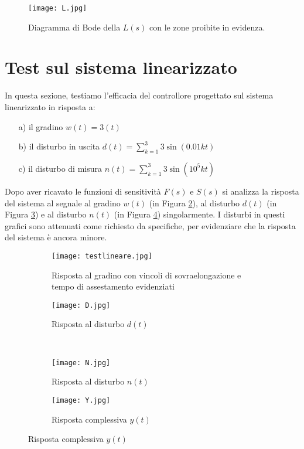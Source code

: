 \documentclass[a4paper, 11pt]{article}
\begin{document}
	\begin{figure}[h]
		\centering
		\texttt{[image: L.jpg]}
		\caption{Diagramma di Bode della $L(s)$ con le zone proibite in evidenza.}
		\label{fig:L}
	\end{figure}
	
	\clearpage
	
	\section{Test sul sistema linearizzato}
	
	In questa sezione, testiamo l'efficacia del controllore progettato sul sistema linearizzato in risposta a:
	\begin{itemize}
		\item[a)] il gradino $w(t)=3(t)$
		\item[b)] il disturbo in uscita $d(t)=\sum_{k=1}^{3}3\sin(0.01kt)$
		\item[c)] il disturbo di misura $n(t)=\sum_{k=1}^{3}3\sin(10^5kt)$
	\end{itemize}
	Dopo aver ricavato le funzioni di sensitività $F(s)$ e $S(s)$ si analizza la risposta del sistema al segnale
	al gradino $w(t)$ (in Figura \ref{fig:testlin}), al disturbo $d(t)$ (in Figura \ref{fig:D}) e al disturbo $n(t)$ (in Figura \ref{fig:N}) singolarmente. I disturbi in questi grafici sono attenuati come richiesto da specifiche, per evidenziare che la risposta del sistema è ancora minore.
	
	\begin{figure}[h!]
		\centering
		\begin{subfigure}{0.49\linewidth}
			\centering
			\texttt{[image: testlineare.jpg]}
			\caption{Risposta al gradino con vincoli di sovraelongazione e tempo di assestamento evidenziati}
			\label{fig:testlin}
		\end{subfigure}
		\hfill
		\begin{subfigure}{0.49\linewidth}
			\texttt{[image: D.jpg]}
			\caption{Risposta al disturbo $d(t)$}
			\label{fig:D}
		\end{subfigure}
		\\
		\begin{subfigure}{0.49\linewidth}
			\texttt{[image: N.jpg]}
			\caption{Risposta al disturbo $n(t)$}
			\label{fig:N}
		\end{subfigure}
		\hfill
		\begin{subfigure}{0.49\linewidth}
			\texttt{[image: Y.jpg]}
			\caption{Risposta complessiva $y(t)$}
			\label{fig:Y}
		\end{subfigure}
	\end{figure}
	
\end{document}
